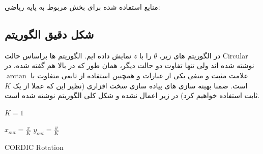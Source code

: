 \documentclass[12pt,titlepage,a4page , tikz , multi,table , svgnames,xcdraw]{article}
\begin{document}
منابع استفاده شده برای بخش مربوط به پایه ریاضی:
\cite{lakshmi} \cite{andraka}     \cite{evaluation}
 
 
\newpage

\subsection{شکل دقیق الگوریتم}

در الگوریتم های زیر، $\theta$ را با $z$ نمایش داده ایم. الگوریتم ها براساس حالت Circular نوشته شده اند ولی تنها تفاوت دو حالت دیگر، همان طور که در بالا هم گفته شده، در علامت مثبت و منفی یکی از عبارات و همچنین استفاده از تابعی متفاوت با $\arctan$ است. ضمنا بهینه سازی های پیاده سازی سخت افزاری (نظیر این که عملا از یک $K$ ثابت استفاده خواهیم کرد) در زیر اعمال نشده و شکل کلی الگوریتم نوشته شده است. \cite{andraka}

\begin{latin}
\begin{algorithm}[H]
\DontPrintSemicolon
{}

\SetAlgoLined
{}

  $K = 1$\;
  
  $x_{out} = \frac{x}{K}$\;
  $y_{out} = \frac{y}{K}$\;
 
 \caption{CORDIC Rotation}
\end{algorithm}
\end{latin}

\newpage
\end{document}
